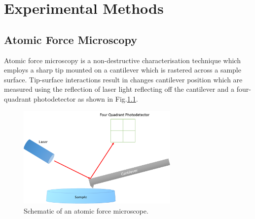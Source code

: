 
\chapter{Experimental Methods}

\section{Atomic Force Microscopy}
Atomic force microscopy   is a non-destructive characterisation technique which employs a sharp tip mounted on a cantilever which is rastered across a sample surface. Tip-surface interactions result in changes cantilever position which are measured using the reflection of laser light reflecting off the cantilever and a four-quadrant photodetector as shown in Fig.\ref{2.1}.

\begin{figure}[h]
	\centering
	\includegraphics[width=0.7\textwidth]{Figs/Ch2/AFM.png}
	\caption {Schematic of an atomic force microscope.}
	\label{2.1}
\end{figure}
\FloatBarrier

